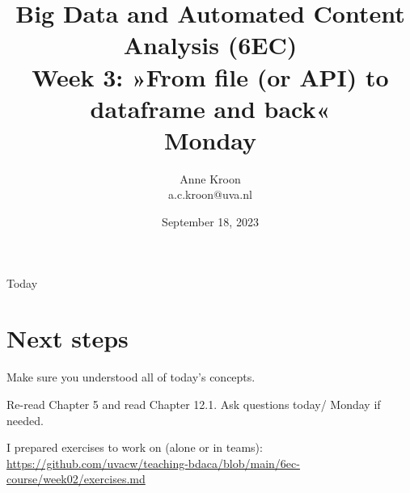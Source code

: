 \documentclass[compress]{beamer}
\begin{document}
\title[Big Data and Automated Content Analysis]{\textbf{Big Data and Automated Content Analysis (6EC)} 
\\Week 3: »From file (or API) to dataframe and back«
\\Monday }
\author[Anne Kroon]{Anne Kroon\\ \footnotesize{a.c.kroon@uva.nl \\}}
\date{September 18, 2023}


\begin{frame}{}
	\titlepage
\end{frame}

\begin{frame}{Today}
	\tableofcontents
\end{frame}

	








\section{Next steps}




\begin{frame}[standout]
Make sure you understood all of today's concepts.

Re-read Chapter 5 and read Chapter 12.1. Ask questions today/ Monday if needed.

I prepared exercises to work on (alone or in teams):
\large{\url{https://github.com/uvacw/teaching-bdaca/blob/main/6ec-course/week02/exercises.md}}
\end{frame}





\begin{frame}
	\printbibliography
\end{frame}
\end{document}
